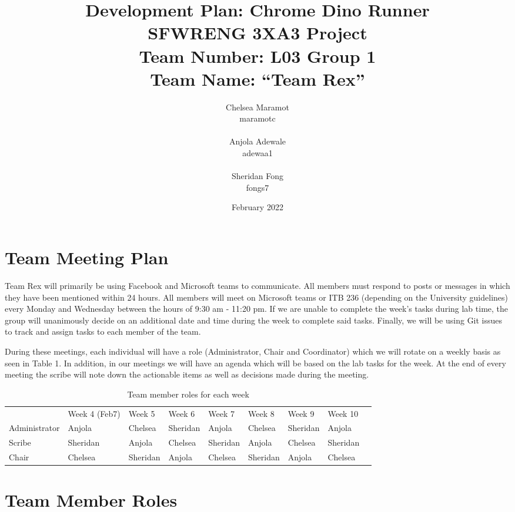 \documentclass{article}
\title{Development Plan: Chrome Dino Runner \\ \bigskip \large SFWRENG 3XA3 Project \\ \bigskip \large Team Number: L03 Group 1 \\ \large Team Name: ``Team Rex'' }
\author{Chelsea Maramot \\ maramotc \\ \\ Anjola Adewale \\ adewaa1 \\ \\ Sheridan Fong \\ fongs7 }
\date{February 2022}
\begin{document}
	
	\maketitle
	
	
	\section{Team Meeting Plan}
	
   Team Rex will primarily be using Facebook and Microsoft teams to communicate.
   All members must respond to posts or messages in which they have been mentioned within 24 hours. 
   All members will meet on Microsoft teams or ITB 236 (depending on the University guidelines) every Monday and Wednesday between the hours of 9:30 am - 11:20 pm. 
   If we are unable to complete the week’s tasks during lab time, the group will unanimously decide on an additional date and time during the week to complete said tasks.
   Finally, we will be using Git issues to track and assign tasks to each member of the team.
   
During these meetings, each individual will have a role (Administrator, Chair and Coordinator) which we will rotate on a weekly basis as seen in Table 1. 
In addition, in our meetings we will have an agenda which will be based on the lab tasks for the week. 
At the end of every meeting the scribe will note down the actionable items as well as decisions made during the meeting.

	
	\begin{table}[]
		\caption{Team member roles for each week}
		\begin{tabular}{|l|l|l|l|l|l|l|l|l}
			
		\cline{1-8}
					& Week 4 (Feb7) & Week 5   & Week 6   & Week 7   & Week 8   & Week 9   & Week 10  &  \\ \cline{1-8}
		Administrator & Anjola        & Chelsea  & Sheridan & Anjola   & Chelsea  & Sheridan & Anjola   &  \\ \cline{1-8}
		Scribe        & Sheridan      & Anjola   & Chelsea  & Sheridan & Anjola   & Chelsea  & Sheridan &  \\ \cline{1-8}
		Chair         & Chelsea       & Sheridan & Anjola   & Chelsea  & Sheridan & Anjola   & Chelsea  &  \\ \cline{1-8}
		\end{tabular}
	
	\end{table}

	\section{Team Member Roles}
	
\end{document}
